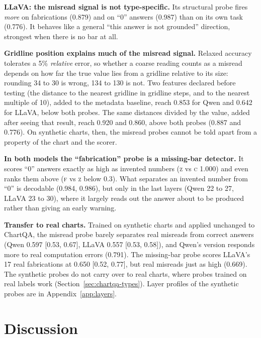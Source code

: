 \documentclass[11pt]{article}
\newcommand{\cls}[1]{\textsc{#1}}
\begin{document}
\textbf{LLaVA: the misread signal is not type-specific.} Its structural probe
fires \emph{more} on fabrications (0.879) and on ``0'' answers (0.987) than on
its own task (0.776). It behaves like a general ``this answer is not grounded''
direction, strongest when there is no bar at all.

\textbf{Gridline position explains much of the misread signal.} Relaxed accuracy
tolerates a 5\% \emph{relative} error, so whether a coarse reading counts as a
misread depends on how far the true value lies from a gridline relative to its
size: rounding 34 to 30 is wrong, 134 to 130 is not. Two features declared before
testing (the distance to the nearest gridline in gridline steps, and to the
nearest multiple of 10), added to the metadata baseline, reach 0.853 for Qwen and
0.642 for LLaVA, below both probes. The same distances divided by the value,
added after seeing that result, reach 0.920 and 0.860, above both probes (0.887
and 0.776). On synthetic charts, then, the misread probes cannot be told apart
from a property of the chart and the scorer.

\textbf{In both models the ``fabrication'' probe is a missing-bar detector.} It
scores ``0'' answers exactly as high as invented numbers (\cls{z} vs \cls{c}
1.000) and even ranks them above (\cls{f} vs \cls{z} below 0.3). What separates
an invented number from ``0'' is decodable (0.984, 0.986), but only in the last
layers (Qwen 22 to 27, LLaVA 23 to 30), where it largely reads out the answer
about to be produced rather than giving an early warning.

\textbf{Transfer to real charts.} Trained on synthetic charts and applied
unchanged to ChartQA, the misread probe barely separates real misreads from
correct answers (Qwen 0.597 [0.53, 0.67], LLaVA 0.557 [0.53, 0.58]), and Qwen's
version responds more to real computation errors (0.791). The missing-bar probe
scores LLaVA's 17 real fabrications at 0.650 [0.52, 0.77], but real misreads
just as high (0.669). The synthetic probes do not carry over to real charts,
where probes trained on real labels work (Section~\ref{sec:chartqa-types}).
Layer profiles of the synthetic probes are in Appendix~\ref{app:layers}.

\section{Discussion}
\label{sec:discussion}
\end{document}

